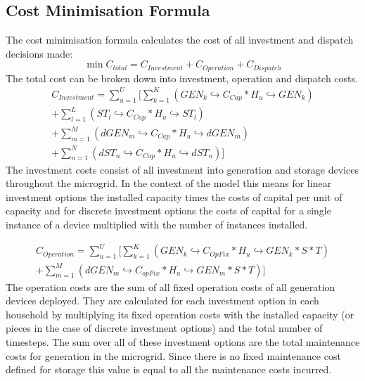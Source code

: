 \documentclass[
	11pt,								%
	DIV10,								%
	a4paper,         					%
	oneside,							%
	headheight=20pt,					%
	footheight=20pt,					%
    parskip=full,						%
    listof=totoc,						%
	bibliography=totoc,					%
	index=totoc,						%
]{scrartcl}
\begin{document}
\subsection{Cost Minimisation Formula}
The cost minimisation formula calculates the cost of all investment and dispatch decisions made:
\begin{equation}
	\min C_{total} = C_{Investment} + C_{Operation} + C_{Dispatch}
\end{equation}
The total cost can be broken down into investment, operation and dispatch costs. 
\begin{equation}
	\begin{split}
		C_{Investment} = \sum_{u=1}^{U}[\sum_{k=1}^K{(GEN_k\hookrightarrow  C_{Cap} * H_u\hookrightarrow  GEN_k)}\\
		+ \sum_{l=1}^L{(ST_l\hookrightarrow  C_{Cap} * H_u\hookrightarrow  ST_l)}\\
		+ \sum_{m=1}^M{(dGEN_m\hookrightarrow  C_{Cap} * H_u\hookrightarrow  dGEN_m)}\\
		+ \sum_{n=1}^N{(dST_n\hookrightarrow  C_{Cap} * H_u\hookrightarrow  dST_n)}]
	\end{split}
\end{equation}
The investment costs consist of all investment into generation and storage devices throughout the microgrid. In the context of the model this means for linear investment options the installed capacity times the costs of capital per unit of capacity and for discrete investment options the costs of capital for a single instance of a device multiplied with the number of instances installed.

\begin{equation}
	\begin{split}
		C_{Operation} = \sum_{u=1}^{U}[\sum_{k=1}^{K}(GEN_k\hookrightarrow  C_{OpFix} * H_u \hookrightarrow GEN_k * S * T)\\
	 	+ \sum_{m=1}^{M}(dGEN_m\hookrightarrow  C_{opFix} * H_u \hookrightarrow GEN_m * S * T)]
	\end{split}
\end{equation}
The operation costs are the sum of all fixed operation costs of all generation devices deployed. They are calculated for each investment option in each household by multiplying its fixed operation costs with the installed capacity (or pieces in the case of discrete investment options) and the total number of timesteps. The sum over all of these investment options are the total maintenance costs for generation in the microgrid. Since there is no fixed maintenance cost defined for storage this value is equal to all the maintenance costs incurred.
\end{document}
